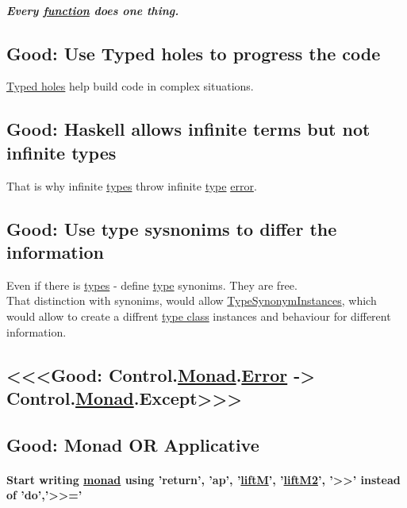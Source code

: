 \documentclass[11pt]{article}
\begin{document}
\subparagraph{Every \hyperref[orge15bc14]{function} does one thing.}
\label{sec:org1956387}

\subsection{\label{org1b1b250}Good: Use Typed holes to progress the code}
\label{sec:orgbfff5cf}
\hyperref[org72b0d38]{Typed holes} help build code in complex situations.\\

\subsection{\label{org7a0d1e0}Good: Haskell allows infinite terms but not infinite types}
\label{sec:org568b309}
That is why infinite \hyperref[org4209edd]{types} throw infinite \hyperref[orgc4aea2f]{type} \hyperref[org2b27c5e]{error}.\\

\subsection{\label{org883ecf7}Good: Use type sysnonims to differ the information}
\label{sec:org871b166}
Even if there is \hyperref[org4209edd]{types} - define \hyperref[orgc4aea2f]{type} synonims. They are free.\\
That distinction with synonims, would allow \hyperref[org0fa5d59]{TypeSynonymInstances}, which would allow to create a diffrent \hyperref[org16d8a26]{type class} instances and behaviour for different information.\\

\subsection{<<<Good: Control.\hyperref[org86a5d95]{Monad}.\hyperref[org2b27c5e]{Error} -> Control.\hyperref[org86a5d95]{Monad}.Except>>>}
\label{sec:org1efe41b}

\subsection{\label{orgf3a867d}Good: Monad OR Applicative}
\label{sec:orgff08f81}

\paragraph{Start writing \hyperref[org86a5d95]{monad} using 'return', 'ap', '\hyperref[orgcbe8a42]{liftM}', '\hyperref[orgff8fa0f]{liftM2}', '>>' instead of 'do','>>='}
\label{sec:orge2fbb5d}
\end{document}
